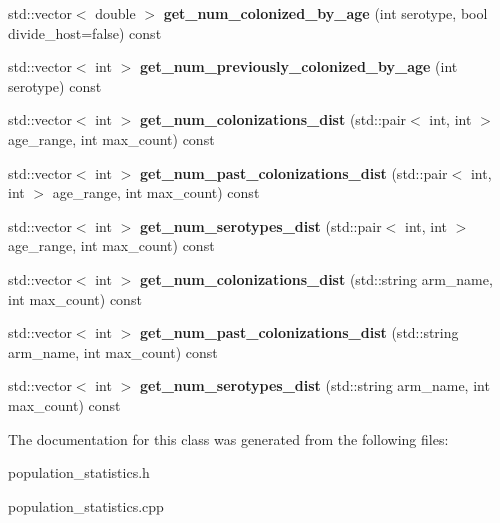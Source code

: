 \begin{DoxyCompactItemize}
std\+::vector$<$ double $>$ {\bfseries get\+\_\+num\+\_\+colonized\+\_\+by\+\_\+age} (int serotype, bool divide\+\_\+host=false) const
\item 
\mbox{\label{class_population_1_1_statistics_ac3c34f840b2f8ab1942e1672a74ce618}} 
std\+::vector$<$ int $>$ {\bfseries get\+\_\+num\+\_\+previously\+\_\+colonized\+\_\+by\+\_\+age} (int serotype) const
\item 
\mbox{\label{class_population_1_1_statistics_a351f7e2e5e5e8491485859acbf6802b4}} 
std\+::vector$<$ int $>$ {\bfseries get\+\_\+num\+\_\+colonizations\+\_\+dist} (std\+::pair$<$ int, int $>$ age\+\_\+range, int max\+\_\+count) const
\item 
\mbox{\label{class_population_1_1_statistics_a1397623d692749948807c4e289561b7d}} 
std\+::vector$<$ int $>$ {\bfseries get\+\_\+num\+\_\+past\+\_\+colonizations\+\_\+dist} (std\+::pair$<$ int, int $>$ age\+\_\+range, int max\+\_\+count) const
\item 
\mbox{\label{class_population_1_1_statistics_a8ca952824e40189aedc5120f33bc6aad}} 
std\+::vector$<$ int $>$ {\bfseries get\+\_\+num\+\_\+serotypes\+\_\+dist} (std\+::pair$<$ int, int $>$ age\+\_\+range, int max\+\_\+count) const
\item 
\mbox{\label{class_population_1_1_statistics_ad8de5e1486123b1367e6ab7ec84144fe}} 
std\+::vector$<$ int $>$ {\bfseries get\+\_\+num\+\_\+colonizations\+\_\+dist} (std\+::string arm\+\_\+name, int max\+\_\+count) const
\item 
\mbox{\label{class_population_1_1_statistics_a1f04f4524770ee9a9ac4f3787a9388f2}} 
std\+::vector$<$ int $>$ {\bfseries get\+\_\+num\+\_\+past\+\_\+colonizations\+\_\+dist} (std\+::string arm\+\_\+name, int max\+\_\+count) const
\item 
\mbox{\label{class_population_1_1_statistics_ac0cb5ac4ea478864894b8c5fc3602012}} 
std\+::vector$<$ int $>$ {\bfseries get\+\_\+num\+\_\+serotypes\+\_\+dist} (std\+::string arm\+\_\+name, int max\+\_\+count) const
\end{DoxyCompactItemize}


The documentation for this class was generated from the following files\+:\begin{DoxyCompactItemize}
\item 
population\+\_\+statistics.\+h\item 
population\+\_\+statistics.\+cpp\end{DoxyCompactItemize}
